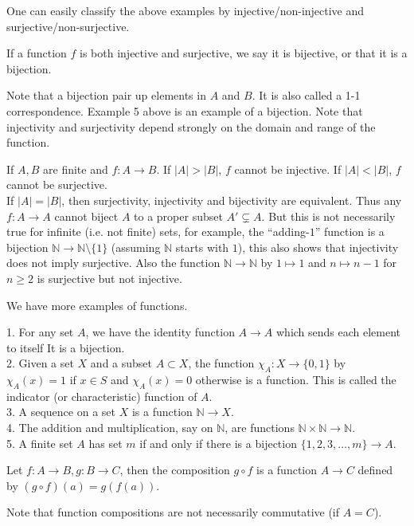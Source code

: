 One can easily classify the above examples by injective/non-injective and surjective/non-surjective.
\begin{definition}
    If a function $f$ is both injective and surjective, we say it is bijective, or that it is a bijection.
\end{definition}
Note that a bijection pair up elements in $A$ and $B$.
It is also called a 1-1 correspondence.
Example 5 above is an example of a bijection.
Note that injectivity and surjectivity depend strongly on the domain and range of the function.
\begin{remark}
    If $A,B$ are finite and $f:A\to B$.
    If $|A|>|B|$, $f$ cannot be injective.
    If $|A|<|B|$, $f$ cannot be surjective.\\
    If $|A|=|B|$, then surjectivity, injectivity and bijectivity are equivalent.
    Thus any $f:A\to A$ cannot biject $A$ to a proper subset $A'\subsetneq A$.
    But this is not necessarily true for infinite (i.e. not finite) sets, for example, the ``adding-$1$'' function is a bijection $\mathbb N\to\mathbb N\setminus\{1\}$ (assuming $\mathbb N$ starts with $1$), this also shows that injectivity does not imply surjective.
    Also the function $\mathbb N\to\mathbb N$ by $1\mapsto 1$ and $n\mapsto n-1$ for $n\ge 2$ is surjective but not injective.
\end{remark}
We have more examples of functions.
\begin{example}
    1. For any set $A$, we have the identity function $A\to A$ which sends each element to itself
    It is a bijection.\\
    2. Given a set $X$ and a subset $A\subset X$, the function $\chi_A:X\to\{0,1\}$ by $\chi_A(x)=1$ if $x\in S$ and $\chi_A(x)=0$ otherwise is a function.
    This is called the indicator (or characteristic) function of $A$.\\
    3. A sequence on a set $X$ is a function $\mathbb N\to X$.\\
    4. The addition and multiplication, say on $\mathbb N$, are functions $\mathbb N\times\mathbb N\to\mathbb N$.\\
    5. A finite set $A$ has set $m$ if and only if there is a bijection $\{1,2,3,\ldots,m\}\to A$.
\end{example}
\begin{definition}
    Let $f:A\to B,g:B\to C$, then the composition $g\circ f$ is a function $A\to C$ defined by $(g\circ f)(a)=g(f(a))$.
\end{definition}
Note that function compositions are not necessarily commutative (if $A=C$).
